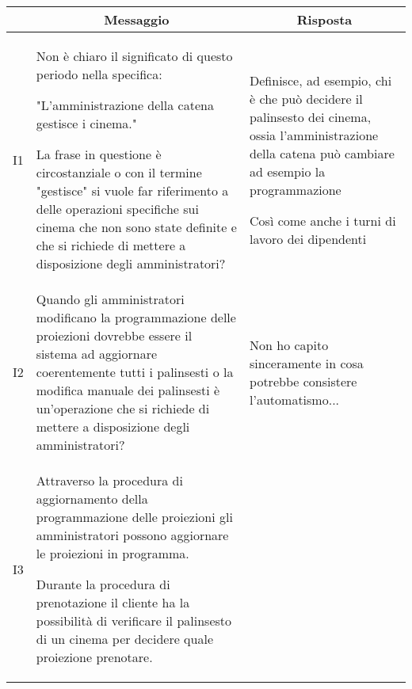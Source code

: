 \begin{longtable}{|p{1cm}|p{7.66cm}|p{7.66cm}|}
      \hline
      \rowcolor{tblhdrcolor}
      \multicolumn{1}{|c|}{\textbf{Id}}                                       &
      \multicolumn{1}{|c|}{\textbf{Messaggio}}                                &
      \multicolumn{1}{|c|}{\textbf{Risposta}}
      \\\hline
      I1                                                                      &
      Non è chiaro il significato di questo periodo nella specifica:

      "L'amministrazione della catena gestisce i cinema."

      La frase in questione è circostanziale o con il termine "gestisce"
      si vuole far riferimento a delle operazioni specifiche sui cinema che
      non sono state definite e che si richiede di mettere a disposizione
      degli amministratori?                                                   &
      Definisce, ad esempio, chi è che può decidere il palinsesto dei cinema,
      ossia l'amministrazione della catena può cambiare ad esempio la
      programmazione

      Così come anche i turni di lavoro dei dipendenti
      \\\hline
      I2                                                                      &
      Quando gli amministratori modificano la programmazione delle proiezioni
      dovrebbe essere il sistema ad aggiornare coerentemente tutti i palinsesti
      o la modifica manuale dei palinsesti è un'operazione che si richiede
      di mettere a disposizione degli amministratori?                         &
      Non ho capito sinceramente in cosa potrebbe consistere l'automatismo...
      \\\hline
      I3                                                                      &
      Attraverso la procedura di aggiornamento della programmazione delle
      proiezioni gli amministratori possono aggiornare le proiezioni in programma.

      Durante la procedura di prenotazione il cliente ha la possibilità di
      verificare il palinsesto di un cinema per decidere quale proiezione
      prenotare.


\end{longtable}
